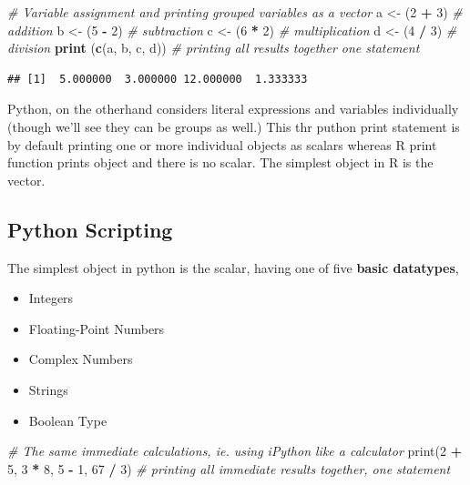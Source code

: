 \documentclass[]{book}
\newenvironment{Shaded}{\begin{snugshade}}{\end{snugshade}}
\newcommand{\KeywordTok}[1]{\textcolor[rgb]{0.13,0.29,0.53}{\textbf{#1}}}
\newcommand{\DecValTok}[1]{\textcolor[rgb]{0.00,0.00,0.81}{#1}}
\newcommand{\StringTok}[1]{\textcolor[rgb]{0.31,0.60,0.02}{#1}}
\newcommand{\CommentTok}[1]{\textcolor[rgb]{0.56,0.35,0.01}{\textit{#1}}}
\newcommand{\OperatorTok}[1]{\textcolor[rgb]{0.81,0.36,0.00}{\textbf{#1}}}
\newcommand{\BuiltInTok}[1]{#1}
\newcommand{\NormalTok}[1]{#1}
\providecommand{\tightlist}{%
  \setlength{\itemsep}{0pt}\setlength{\parskip}{0pt}}
\theoremstyle{definition}
\theoremstyle{definition}
\theoremstyle{definition}
\theoremstyle{remark}
\begin{document}
\begin{Shaded}
\begin{Highlighting}[]
\CommentTok{# Variable assignment and printing grouped variables as a vector}
\NormalTok{a <-}\StringTok{ }\NormalTok{(}\DecValTok{2} \OperatorTok{+}\StringTok{ }\DecValTok{3}\NormalTok{)           }\CommentTok{# addition}
\NormalTok{b <-}\StringTok{ }\NormalTok{(}\DecValTok{5} \OperatorTok{-}\StringTok{ }\DecValTok{2}\NormalTok{)           }\CommentTok{# subtraction}
\NormalTok{c <-}\StringTok{ }\NormalTok{(}\DecValTok{6} \OperatorTok{*}\StringTok{ }\DecValTok{2}\NormalTok{)           }\CommentTok{# multiplication}
\NormalTok{d <-}\StringTok{ }\NormalTok{(}\DecValTok{4} \OperatorTok{/}\StringTok{ }\DecValTok{3}\NormalTok{)           }\CommentTok{# division}
\KeywordTok{print}\NormalTok{ (}\KeywordTok{c}\NormalTok{(a, b, c, d))  }\CommentTok{# printing all results together one statement}
\end{Highlighting}
\end{Shaded}

\begin{verbatim}
## [1]  5.000000  3.000000 12.000000  1.333333
\end{verbatim}

Python, on the otherhand considers literal expressions and variables
individually (though we'll see they can be groups as well.) This thr
puthon print statement is by default printing one or more individual
objects as scalars whereas R print function prints object and there is
no scalar. The simplest object in R is the vector.

\subsection{Python Scripting}\label{python-scripting}

The simplest object in python is the scalar, having one of five
\textbf{basic datatypes},

\begin{itemize}
\tightlist
\item
  Integers
\item
  Floating-Point Numbers
\item
  Complex Numbers
\item
  Strings
\item
  Boolean Type
\end{itemize}

\begin{Shaded}
\begin{Highlighting}[]
\CommentTok{# The same immediate calculations, ie. using iPython like a calculator}
\BuiltInTok{print}\NormalTok{(}\DecValTok{2} \OperatorTok{+} \DecValTok{5}\NormalTok{, }\DecValTok{3} \OperatorTok{*} \DecValTok{8}\NormalTok{, }\DecValTok{5} \OperatorTok{-} \DecValTok{1}\NormalTok{, }\DecValTok{67} \OperatorTok{/} \DecValTok{3}\NormalTok{) }\CommentTok{# printing all immediate results together, one statement}
\end{Highlighting}
\end{Shaded}
\end{document}
